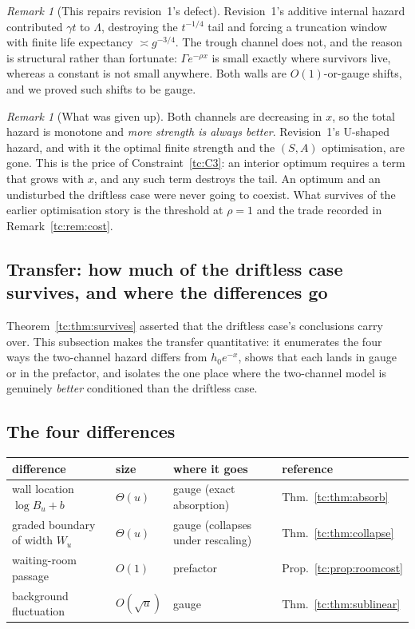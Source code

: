 \documentclass[11pt]{article}
\numberwithin{equation}{section}
\theoremstyle{plain}
\theoremstyle{definition}
\theoremstyle{remark}
\newtheorem{remark}[theorem]{Remark}
\begin{document}
\begin{remark}[This repairs revision~1's defect]\label{tc:rem:repair}
Revision~1's additive internal hazard contributed $\gamma t$ to
$\Lambda$, destroying the $t^{-1/4}$ tail and forcing a truncation
window with finite life expectancy $\asymp g^{-3/4}$. The trough channel
does not, and the reason is structural rather than fortunate:
$\Gamma e^{-\rho x}$ is small exactly where survivors live, whereas a
constant is not small anywhere. Both walls are $O(1)$-or-gauge shifts,
and we proved such shifts to be gauge.
\end{remark}

\begin{remark}[What was given up]\label{tc:rem:givenup}
Both channels are decreasing in $x$, so the total hazard is monotone and
\emph{more strength is always better}. Revision~1's U-shaped hazard, and
with it the optimal finite strength and the $(S,A)$ optimisation, are
gone. This is the price of Constraint~\ref{tc:C3}: an interior optimum
requires a term that grows with $x$, and any such term destroys the
tail. An optimum and an undisturbed the driftless case were never going to
coexist. What survives of the earlier optimisation story is the
threshold at $\rho=1$ and the trade recorded in
Remark~\ref{tc:rem:cost}.
\end{remark}

\subsection{Transfer: how much of the driftless case survives, and where the
differences go}\label{tc:sub:transfer}

Theorem~\ref{tc:thm:survives} asserted that the driftless case's conclusions
carry over. This subsection makes the transfer quantitative: it
enumerates the four ways the two-channel hazard differs from
$h_{0}e^{-x}$, shows that each lands in gauge or in the prefactor, and
isolates the one place where the two-channel model is genuinely
\emph{better} conditioned than the driftless case.

\subsection{The four differences}\label{tc:subsub:four}

\begin{center}\small
\begin{tabular}{@{}llll@{}}
\toprule
difference & size & where it goes & reference\\
\midrule
wall location $\log B_u+b$ & $\Theta(u)$ & gauge (exact absorption) &
Thm.~\ref{tc:thm:absorb}\\
graded boundary of width $W_u$ & $\Theta(u)$ & gauge (collapses under
rescaling) & Thm.~\ref{tc:thm:collapse}\\
waiting-room passage & $O(1)$ & prefactor & Prop.~\ref{tc:prop:roomcost}\\
background fluctuation & $O(\sqrt u)$ & gauge &
Thm.~\ref{tc:thm:sublinear}\\
\bottomrule
\end{tabular}
\end{center}
\end{document}
